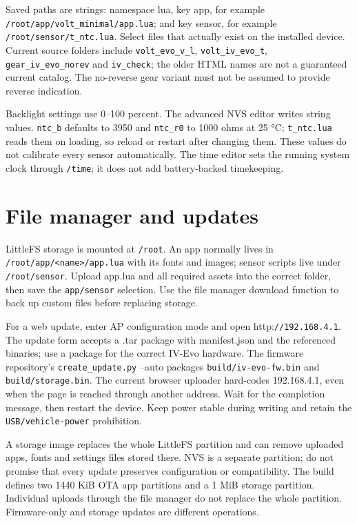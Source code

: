 Saved paths are strings: namespace lua, key app, for example \nolinkurl{/root/app/volt_minimal/app.lua}; and key sensor, for example \nolinkurl{/root/sensor/t_ntc.lua}. Select files that actually exist on the installed device. Current source folders include \nolinkurl{volt_evo_v_l}, \nolinkurl{volt_iv_evo_t}, \nolinkurl{gear_iv_evo_norev} and \nolinkurl{iv_check}; the older HTML names are not a guaranteed current catalog. The no-reverse gear variant must not be assumed to provide reverse indication.

Backlight settings use 0–100 percent. The advanced NVS editor writes string values. \nolinkurl{ntc_b} defaults to 3950 and \nolinkurl{ntc_r0} to 1000 ohms at 25 °C; \nolinkurl{t_ntc.lua} reads them on loading, so reload or restart after changing them. These values do not calibrate every sensor automatically. The time editor sets the running system clock through \nolinkurl{/time}; it does not add battery-backed timekeeping.

\section{File manager and updates}
LittleFS storage is mounted at \nolinkurl{/root}. An app normally lives in \nolinkurl{/root/app/<name>/app.lua} with its fonts and images; sensor scripts live under \nolinkurl{/root/sensor}. Upload app.lua and all required assets into the correct folder, then save the \nolinkurl{app/sensor} selection. Use the file manager download function to back up custom files before replacing storage.

For a web update, enter AP configuration mode and open http:\nolinkurl{//192.168.4.1}. The update form accepts a .tar package with manifest.json and the referenced binaries; use a package for the correct IV-Evo hardware. The firmware repository's \nolinkurl{create_update.py} --auto packages \nolinkurl{build/iv-evo-fw.bin} and \nolinkurl{build/storage.bin}. The current browser uploader hard-codes 192.168.4.1, even when the page is reached through another address. Wait for the completion message, then restart the device. Keep power stable during writing and retain the \nolinkurl{USB/vehicle-power} prohibition.

A storage image replaces the whole LittleFS partition and can remove uploaded apps, fonts and settings files stored there. NVS is a separate partition; do not promise that every update preserves configuration or compatibility. The build defines two 1440 KiB OTA app partitions and a 1 MiB storage partition. Individual uploads through the file manager do not replace the whole partition. Firmware-only and storage updates are different operations.

